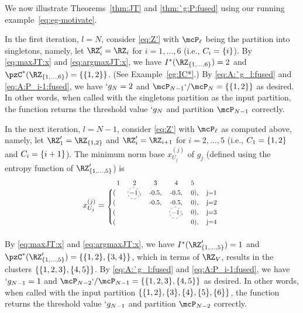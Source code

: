 \begin{example}
    \label{eg:thms}
	We now illustrate Theorems~\ref{thm:JT} and \ref{thm:`g:P:fused} using our running
	example~\eqref{eq:eg-motivate}.

	In the first iteration, $l=N$, consider \eqref{eq:Z'} with $\mcP_{\ell}$ being the partition into
	singletons, namely, let $\RZ'_i=\RZ_i$ for $i=1, \dots, 6$ (i.e., $C_i=\{i\}$).
	By \eqref{eq:maxJT:x} and \eqref{eq:argmaxJT:x},
	we have $I^{*}(\RZ_{\Set{1,\ldots,6}}) = 2$ and $\pzC^*(\RZ_{\Set{1,\dots,6}})=\Set {\Set {1,2}}$. (See Example~\ref{eg:IC*}.)
	By \eqref{eq:A:`g_l:fused} and \eqref{eq:A:P_i-1:fused},
	we have $`g_{N}=2$ and $\mcP_{N-1}`/\mcP_{N}=\Set{\Set{1,2}}$ as desired. 
	In other words, when called with the
	singletons partition
	as the input partition, the function \Agglomerate returns the threshold value $`g_{N}$ and partition
	$\mcP_{N-1}$ correctly.
	
	In the next iteration, $l=N-1$, consider \eqref{eq:Z'} with $\mcP_{\ell}$ as computed above,
	namely, let $\RZ'_1 = \RZ_{\Set{1,2}}$ and $\RZ'_{i} = \RZ_{i+1}$ for
	$i=2,\ldots,5$ (i.e., $C_1=\{1,2\}$ and $C_i=\{i+1\}$).
	The minimum norm base $x_{U_{j}}^{(j)}$ of $g_{j}$ (defined using the entropy function of $\RZ'_{\Set{1,\dots,5}}$) is
	\begin{align*}
	x_{U_j}^{(j)} =\scalebox{0.8}{
	\begin{blockarray}{lcc cl c}
		\phantom{n}1 & 2 & 3 & 4 & 5 \\
					\begin{block}{\{lcc cc c}
							 (& \circled{-1}, & -0.5, & -0.5, & 0),   & j=1 \\
							 (&     & -0.5, & -0.5, & 0),   & j=2 \\
							 (&     &       & \circled{-1},   & 0),   & j=3 \\
							 (&     &       &       & 0),   & j=4 \\
					\end{block}
	\end{blockarray}}
	\end{align*}
	By \eqref{eq:maxJT:x} and \eqref{eq:argmaxJT:x},
	we have $I^{*}(\RZ'_{\Set{1,\ldots,5}}) = 1$ and 
	$\pzC^{*}(\RZ'_{\Set{1,\ldots,5}}) = \Set{\Set{1,2},\Set{3,4}}$, which in terms of
	$\RZ_{V}$, results in the clusters $\{\{1,2,3\},\{4,5\}\}$.
	By \eqref{eq:A:`g_l:fused} and \eqref{eq:A:P_i-1:fused},
	we have $`g_{N-1}=1$ and $\mcP_{N-2}`/\mcP_{N-1}=\Set{\Set{1,2,3},\Set{4,5}}$ as desired. 
	In other words, when called with the input partition $\{\{1,2\},\{3\},\{4\},\{5\},
	\{6\}\}$, the function \Agglomerate returns the threshold value $`g_{N-1}$ and partition
	$\mcP_{N-2}$ correctly.


\end{example}

